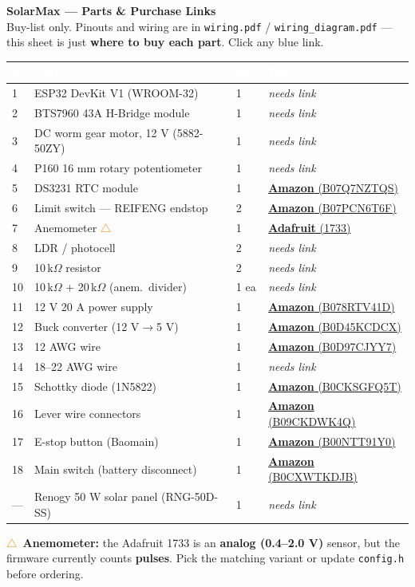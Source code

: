 \documentclass[11pt]{article}
\newcommand{\tc}[1]{\textcolor{white}{\textbf{#1}}}
\newcommand{\amzn}[1]{\href{https://www.amazon.com/dp/#1}{\textbf{Amazon} \footnotesize(#1)}}
\newcommand{\ada}[1]{\href{https://www.adafruit.com/product/#1}{\textbf{Adafruit} \footnotesize(#1)}}
\newcommand{\nolink}{\textcolor{mutegray}{\itshape needs link}}
\begin{document}
\pagestyle{empty}

\begin{center}
  {\LARGE\bfseries SolarMax --- Parts \& Purchase Links}\\[3pt]
  {\small Buy-list only. Pinouts and wiring are in \texttt{wiring.pdf} /
   \texttt{wiring\_diagram.pdf} --- this sheet is just \textbf{where to buy each part}.
   Click any blue link.}
\end{center}
\vspace{8pt}

\begin{tabularx}{\textwidth}{@{}C{0.8cm} P C{1.4cm} >{\RaggedRight\arraybackslash}p{5.2cm}@{}}
\toprule
{}\tc{\#} & \tc{Part} & \tc{Qty} & \tc{Buy}\\
  & ESP32 DevKit V1 (WROOM-32)                    & 1     & \nolink\\
2  & BTS7960 43A H-Bridge module                   & 1     & \nolink\\
3  & DC worm gear motor, 12 V (5882-50ZY)          & 1     & \nolink\\
4  & P160 16 mm rotary potentiometer               & 1     & \nolink\\
5  & DS3231 RTC module                             & 1     & \amzn{B07Q7NZTQS}\\
6  & Limit switch --- REIFENG endstop              & 2     & \amzn{B07PCN6T6F}\\
7  & Anemometer \textcolor{DarkOrange}{$\triangle$} & 1    & \ada{1733}\\
8  & LDR / photocell                               & 2     & \nolink\\
9  & 10\,k$\Omega$ resistor                        & 2     & \nolink\\
10 & 10\,k$\Omega$ + 20\,k$\Omega$ (anem.\ divider) & 1 ea & \nolink\\
11 & 12 V 20 A power supply                         & 1     & \amzn{B078RTV41D}\\
12 & Buck converter (12 V$\rightarrow$5 V)          & 1     & \amzn{B0D45KCDCX}\\
13 & 12 AWG wire                                    & 1     & \amzn{B0D97CJYY7}\\
14 & 18--22 AWG wire                                & 1     & \nolink\\
15 & Schottky diode (1N5822)                        & 1     & \amzn{B0CKSGFQ5T}\\
16 & Lever wire connectors                          & 1     & \amzn{B09CKDWK4Q}\\
17 & E-stop button (Baomain)                        & 1     & \amzn{B00NTT91Y0}\\
18 & Main switch (battery disconnect)               & 1     & \amzn{B0CXWTKDJB}\\
--- & Renogy 50 W solar panel (RNG-50D-SS)         & 1     & \nolink\\
\bottomrule
\end{tabularx}

\vspace{10pt}
\noindent\textcolor{DarkOrange}{$\triangle$}~\small\textbf{Anemometer:} the Adafruit 1733 is an
\textbf{analog (0.4--2.0 V)} sensor, but the firmware currently counts \textbf{pulses}. Pick the
matching variant or update \texttt{config.h} before ordering.
\end{document}
